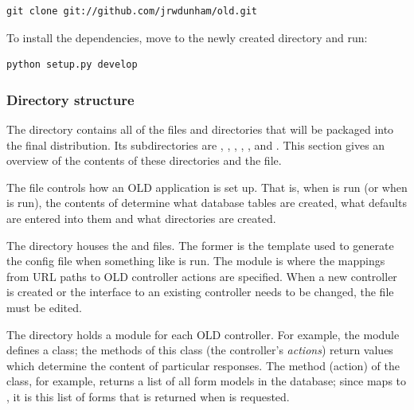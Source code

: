 \documentclass[letterpaper,10pt,english]{sphinxmanual}
\begin{document}
\begin{Verbatim}[commandchars=\\\{\}]
git clone git://github.com/jrwdunham/old.git
\end{Verbatim}

To install the dependencies, move to the newly created  directory and
run:

\begin{Verbatim}[commandchars=\\\{\}]
python setup.py develop
\end{Verbatim}


\subsubsection{Directory structure}
\label{installation:directory-structure}
The  directory contains all of the files and
directories that will be packaged into the final distribution.  Its
subdirectories are , , , , ,
and .  This section gives an overview of the contents of these
directories and the  file.

The  file controls how an OLD application is set up.  That is,
when  is run (or when  is run),
the contents of  determine what database tables are created, what
defaults are entered into them and what directories are created.

The  directory houses the  and 
files.  The former is the template used to generate the config file when
something like  is run.  The 
module is where the mappings from URL paths to OLD controller actions are
specified.  When a new controller is created or the interface to an existing
controller needs to be changed, the  file must be edited.

The  directory holds a module for each OLD controller.  For
example, the  module defines a 
class; the methods of this class (the controller's \emph{actions}) return values
which determine the content of particular responses.  The  method
(action) of the  class, for example, returns a list of all
form models in the database; since  maps  to
, it is this list of forms that is returned when
 is requested.
\end{document}
